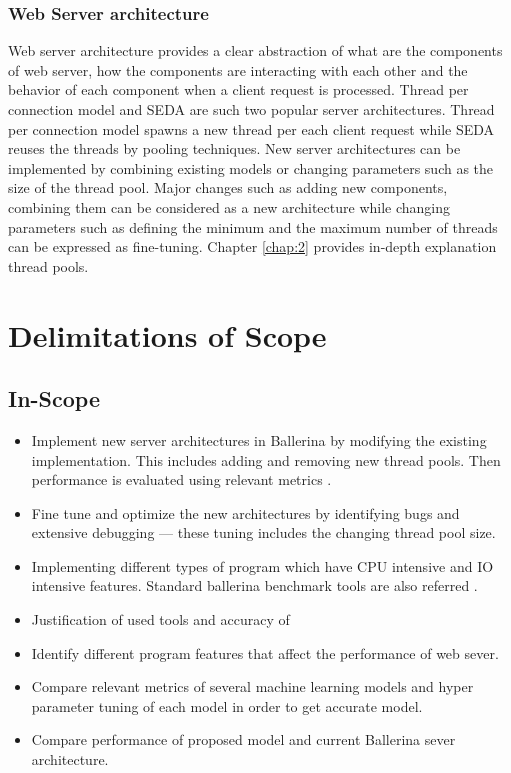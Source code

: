 \subsubsection{Web Server architecture} \label{sub:def_web_server_architecture}

 Web server architecture provides a clear abstraction of what are the components of web server, how the components are interacting with each other and the behavior of each component when a client request is processed. Thread per connection model \cite{comp_ac} and SEDA \cite{seda} are such two popular server architectures. Thread per connection model spawns a new thread per each client request while SEDA reuses the threads by pooling techniques. New server architectures can be implemented by combining existing models or changing parameters such as the size of the thread pool. Major changes such as adding new components, combining them can be considered as a new architecture while changing parameters such as defining the minimum and the maximum number of threads can be expressed as fine-tuning. Chapter \ref{chap:2} provides in-depth explanation thread pools.


\section{Delimitations of Scope}

\subsection{In-Scope}

\begin{itemize}
	\item Implement new server architectures in Ballerina by modifying the existing implementation. This includes adding and removing new thread pools. Then performance is evaluated using relevant metrics .
	\item Fine tune and optimize the new architectures by identifying bugs and extensive debugging — these tuning includes the changing thread pool size.
	\item Implementing different types of program which have CPU intensive and IO intensive features. Standard ballerina benchmark tools are also referred \cite{Ballerina_Performance}. 
	\item Justification of used tools and accuracy of 
	\item Identify different program features that affect the performance of web sever.
	\item Compare relevant metrics of several machine learning models and hyper parameter tuning of each model in order to get accurate model.
	\item Compare performance of proposed model and current Ballerina sever architecture.  
\end{itemize}


